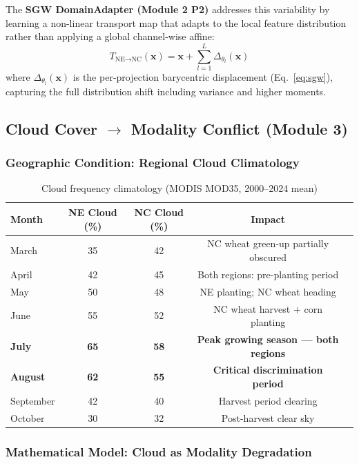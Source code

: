 The \textbf{SGW DomainAdapter (Module 2 P2)} addresses this variability
by learning a non-linear transport map that adapts to the local feature
distribution rather than applying a global channel-wise affine:
\begin{equation}
    T_{\text{NE}\to\text{NC}}(\mathbf{x}) = \mathbf{x} + \sum_{l=1}^L
    \Delta_{\theta_l}(\mathbf{x})
\end{equation}
where $\Delta_{\theta_l}(\mathbf{x})$ is the per-projection barycentric
displacement (Eq.~\ref{eq:sgw}), capturing the full distribution shift
including variance and higher moments.

\subsection{Cloud Cover $\to$ Modality Conflict (Module 3)}

\subsubsection{Geographic Condition: Regional Cloud Climatology}

\begin{table}[h]
\centering
\caption{Cloud frequency climatology (MODIS MOD35, 2000--2024 mean)}
\begin{tabular}{lcccc}
\toprule
\textbf{Month} & \textbf{NE Cloud (\%)} & \textbf{NC Cloud (\%)} & \textbf{Impact} \\
\midrule
March & 35 & 42 & NC wheat green-up partially obscured \\
April & 42 & 45 & Both regions: pre-planting period \\
May & 50 & 48 & NE planting; NC wheat heading \\
June & 55 & 52 & NC wheat harvest + corn planting \\
\textbf{July} & \textbf{65} & \textbf{58} & \textbf{Peak growing season — both regions} \\
\textbf{August} & \textbf{62} & \textbf{55} & \textbf{Critical discrimination period} \\
September & 42 & 40 & Harvest period clearing \\
October & 30 & 32 & Post-harvest clear sky \\
\bottomrule
\end{tabular}
\end{table}

\subsubsection{Mathematical Model: Cloud as Modality Degradation}

